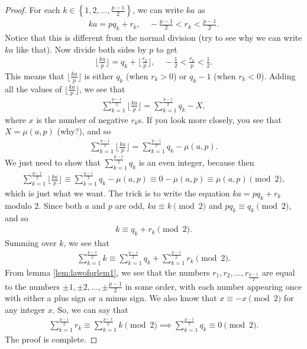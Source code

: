 \documentclass{subfile}
\begin{document}
\begin{proof}
	For each $k \in \left\{1, 2, \dots, \frac{p-1}{2} \right\}$, we can write $ka$ as
	\begin{align*}
	ka = pq_k + r_k, \quad -\frac{p-1}{2}<r_k< \frac{p-1}{2}.
	\end{align*}
	Notice that this is different from the normal division (try to see why we can write $ka$ like that). Now divide both sides by $p$ to get
	\begin{align*}
	\Big\lfloor\frac{ka}{p} \Big\rfloor = q_k + \Big\lfloor\frac{r_k}{p}\Big\rfloor, \quad -\frac{1}{2}<\frac{r_k}{p}< \frac{1}{2}.
	\end{align*}
	This means that $\Big\lfloor\frac{ka}{p} \Big\rfloor$ is either $q_k$ (when $r_k >0$) or $q_k -1$ (when $r_k<0$). Adding all the values of $\Big\lfloor\frac{ka}{p} \Big\rfloor$, we see that
	\begin{align*}
	\displaystyle \sum_{k=1}^{\frac{p-1}{2}} \Big\lfloor\frac{ka}{p} \Big\rfloor = \sum_{k=1}^{\frac{p-1}{2}} q_k - X,
	\end{align*}
	where $x$ is the number of negative $r_k$s. If you look more closely, you see that $X= \mu(a,p)$ (why?), and so
	\begin{align*}
	\displaystyle \sum_{k=1}^{\frac{p-1}{2}} \Big\lfloor\frac{ka}{p} \Big\rfloor = \sum_{k=1}^{\frac{p-1}{2}} q_k - \mu(a,p).
	\end{align*}
	We just need to show that $\displaystyle\sum_{k=1}^{\frac{p-1}{2}} q_k$ is an even integer, because then 
	\begin{align*}
	\sum_{k=1}^{\frac{p-1}{2}} \Big\lfloor\frac{ka}{p} \Big\rfloor \equiv \sum_{k=1}^{\frac{p-1}{2}} q_k - \mu(a,p) \equiv 0 -  \mu(a,p) \equiv  \mu(a,p) \pmod 2,
	\end{align*}
	which is just what we want. The trick is to write the equation $ka = pq_k + r_k$ modulo $2$. Since both $a$ and $p$ are odd, $ka \equiv k \pmod 2$ and $pq_k \equiv q_k \pmod 2$, and so
	\begin{align*}
	k \equiv q_k + r_k \pmod 2.
	\end{align*}
	Summing over $k$, we see that
	\begin{align*}
	\sum_{k=1}^{\frac{p-1}{2}}k \equiv \sum_{k=1}^{\frac{p-1}{2}} q_k + \sum_{k=1}^{\frac{p-1}{2}} r_k \pmod 2.
	\end{align*}
	From lemma \eqref{lem:lawofqrlem1}, we see that the numbers $r_1, r_2, \ldots, r_{\frac{p-1}{2}}$ are equal to the numbers $\pm 1, \pm 2, \ldots, \pm \frac{p-1}{2}$ in some order, with each number appearing once with either a plus sign or a minus sign. We also know that $x \equiv -x \pmod 2$ for any integer $x$. So, we can say that
	\begin{align*}
	\sum_{k=1}^{\frac{p-1}{2}} r_k \equiv \sum_{k=1}^{\frac{p-1}{2}}k \pmod 2 \implies \sum_{k=1}^{\frac{p-1}{2}} q_k \equiv 0 \pmod 2.
	\end{align*}
	The proof is complete.
\end{proof}
\end{document}
